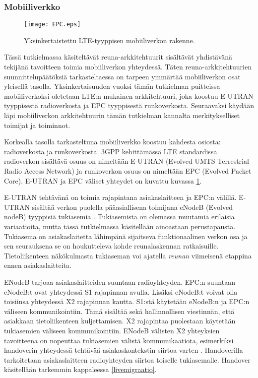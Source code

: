 \subsubsection{Mobiiliverkko}
\begin{figure}[tb]
\texttt{[image: EPC.eps]}
\caption{Yksinkertaistettu LTE-tyyppisen mobiiliverkon rakenne.} \label{fig:mobiarch}
\end{figure}

Tässä tutkielmassa käsiteltävät reuna-arkkitehtuurit sisältävät yhdistävänä tekijänä tavoitteen toimia mobiiliverkon yhteydessä. 
Täten reuna-arkkitehtuurien suunnittelupäätöksiä tarkasteltaessa on tarpeen ymmärtää mobiiliverkon osat yleisellä tasolla.
Yksinkertaisuuden vuoksi tämän tutkielman puitteissa mobiiliverkoksi oletetaan LTE:n mukainen arkkitehtuuri, joka koostuu E-UTRAN tyyppisestä radioverkosta ja EPC tyyppisestä runkoverkosta.
Seuraavaksi käydään läpi mobiiliverkon arkkitehtuurin tämän tutkielman kannalta merkitykselliset toimijat ja toiminnot.

Korkealla tasolla tarkasteltuna mobiiliverkko koostuu kahdesta osiosta: radioverkosta ja runkoverkosta. 3GPP kehittämässä LTE standardissa radioverkon sisältävä osuus on nimeltään E-UTRAN (Evolved UMTS Terrestrial Radio Access Network) ja runkoverkon osuus on nimeltään EPC (Evolved Packet Core).
E-UTRAN ja EPC väliset yhteydet on kuvattu kuvassa \ref{fig:mobiarch}.

E-UTRAN tehtävänä on toimia rajapintana asiakaslaitteen ja EPC:n välillä. 
E-UTRAN sisältää verkon puolella pääasiallisena toimijana eNodeB (Evolved nodeB) tyyppisiä tukiasemia \cite{etsieutran}.
Tukiasemista on olemassa muutamia erilaisia variaatioita, mutta tässä tutkielmassa käsitellään ainoastaan perustapausta.
Tukiasema on asiakaslaitetta lähimpänä sijaitseva funktionaalinen verkon osa ja sen seurauksena se on houkutteleva kohde reunalaskennan ratkaisuille. Tietoliikenteen näkökulmasta tukiaseman voi ajatella \textit{reunan} viimeisenä etappina ennen asiakaslaitteita. 

ENodeB tarjoaa asiakaslaitteiden suuntaan radioyhteyden.
EPC:n suuntaan eNodeB:t ovat yhteydessä S1 rajapinnan avulla.
Lisäksi eNodeB:t voivat olla toisiinsa yhteydessä X2 rajapinnan kautta.
S1:stä käytetään eNodeB:n ja EPC:n väliseen kommunikointiin. Tämä sisältää sekä hallinnollisen viestinnän, että asiakkaan tietoliikenteen kuljettamisen.
X2 rajapintaa puolestaan käytetään tukiasemien väliseen kommunikointiin. 
ENodeB välisten X2 yhteyksien tavoitteena on nopeuttaa tukiasemien välistä kommunikaatiota, esimerkiksi handoverin yhteydessä tehtävää asiakaskontekstin siirtoa varten \cite{3gpplte}.
Handoverilla tarkoitetaan asiakaslaitteen radioyhteyden siirtoa toiselle tukiasemalle. Handover käsitellään tarkemmin kappaleessa \ref{livemigraatio}.

